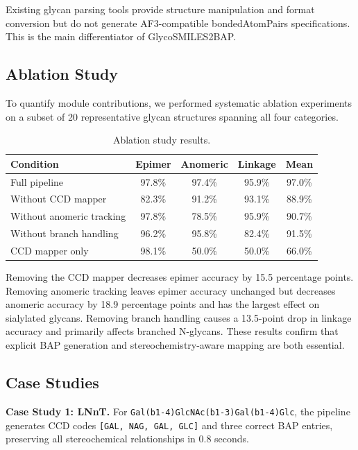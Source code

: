 \documentclass[11pt,a4paper]{article}
\begin{document}
Existing glycan parsing tools provide structure manipulation and format conversion but do not generate AF3-compatible bondedAtomPairs specifications. This is the main differentiator of GlycoSMILES2BAP.

\subsection{Ablation Study}

To quantify module contributions, we performed systematic ablation experiments on a subset of 20 representative glycan structures spanning all four categories.

\begin{table}[htbp]
\centering
\caption{Ablation study results.}
\begin{tabular}{lcccc}
\toprule
Condition & Epimer & Anomeric & Linkage & Mean \\
\midrule
Full pipeline & 97.8\% & 97.4\% & 95.9\% & 97.0\% \\
Without CCD mapper & 82.3\% & 91.2\% & 93.1\% & 88.9\% \\
Without anomeric tracking & 97.8\% & 78.5\% & 95.9\% & 90.7\% \\
Without branch handling & 96.2\% & 95.8\% & 82.4\% & 91.5\% \\
CCD mapper only & 98.1\% & 50.0\% & 50.0\% & 66.0\% \\
\bottomrule
\end{tabular}
\end{table}

Removing the CCD mapper decreases epimer accuracy by 15.5 percentage points. Removing anomeric tracking leaves epimer accuracy unchanged but decreases anomeric accuracy by 18.9 percentage points and has the largest effect on sialylated glycans. Removing branch handling causes a 13.5-point drop in linkage accuracy and primarily affects branched N-glycans. These results confirm that explicit BAP generation and stereochemistry-aware mapping are both essential.

\subsection{Case Studies}

\textbf{Case Study 1: LNnT.} For \texttt{Gal(b1-4)GlcNAc(b1-3)Gal(b1-4)Glc}, the pipeline generates CCD codes \texttt{[GAL, NAG, GAL, GLC]} and three correct BAP entries, preserving all stereochemical relationships in 0.8 seconds.
\end{document}
